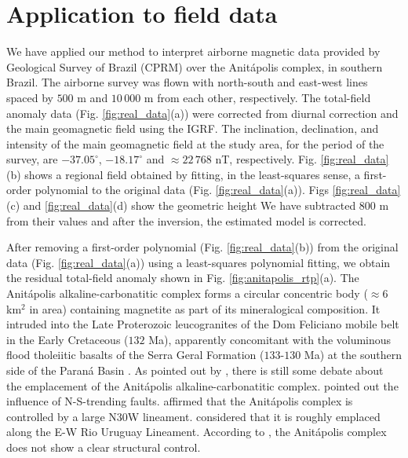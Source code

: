 \section{Application to field data}

We have applied our method to interpret airborne magnetic data provided by 
Geological Survey of Brazil (CPRM) over the Anit{\'a}polis complex, 
in southern Brazil. 
The airborne survey was flown with north-south and east-west lines spaced by $500$ m and $10\,000$ m from each other, respectively. 
The total-field anomaly data (Fig. \ref{fig:real_data}(a)) were corrected from diurnal correction and the main geomagnetic field using the IGRF. 
The inclination, declination, and intensity of the main geomagnetic field at the study area, 
for the period of the survey, are $-37.05^{\circ}$, $-18.17^{\circ}$ and 
$\approx 22 \, 768 $ nT, respectively.
Fig. \ref{fig:real_data}(b) shows a regional field obtained by fitting, in the least-squares sense, a first-order polynomial to the original data (Fig. \ref{fig:real_data}(a)).
Figs \ref{fig:real_data}(c) and \ref{fig:real_data}(d) show the geometric height
We have subtracted 800 m from their values and after the inversion, the estimated model is corrected.  

After removing a first-order polynomial (Fig. \ref{fig:real_data}(b)) from the original data  
(Fig. \ref{fig:real_data}(a)) using a least-squares polynomial fitting, we obtain the residual total-field anomaly shown in Fig. \ref{fig:anitapolis_rtp}(a).
The Anit{\'a}polis alkaline-carbonatitic complex forms a circular concentric body 
($\approx 6$ km$^{2}$ in area) containing magnetite as part of its mineralogical 
composition. 
It intruded into the Late Proterozoic leucogranites of the Dom Feliciano 
mobile belt in the Early Cretaceous ($132$ Ma), apparently concomitant with the 
voluminous flood tholeiitic basalts of the Serra Geral Formation ($133$-$130$ Ma) 
at the southern side of the Paran{\'a} Basin \citep{gibson-1999, scheibe-etal2005}.
As pointed out by \citet{GOMES2018}, there is still some debate about the emplacement 
of the Anit{\'a}polis alkaline-carbonatitic complex. 
\citet{melcher-coutinho1966} pointed out the influence of N-S-trending faults.
\citet{horbach-marimon1980} affirmed that the Anit{\'a}polis complex is controlled by 
a large N30W lineament. 
\citet{scheibe-etal2005} considered that it is roughly emplaced along the E-W Rio 
Uruguay Lineament. 
According to \citet{riccomini-etal2005}, the Anit{\'a}polis 
complex does not show a clear structural control. 

